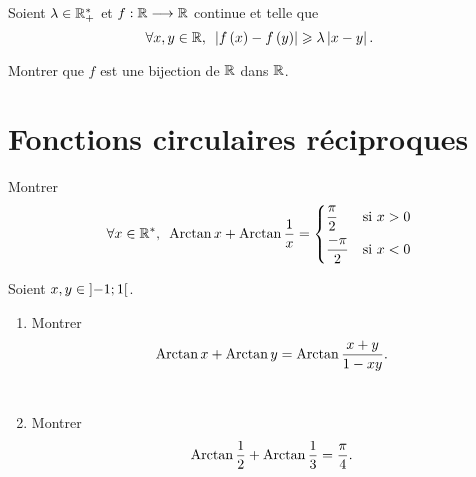 \begin{corr}
\end{corr}

\begin{exo}
Soient \(\lambda\in\mathbb{R}_+^*\) et \(f:\mathbb{R}\longrightarrow\mathbb{R}\) continue et telle que \[\quantifs{\forall x,y\in\R}\abs{f\paren{x}-f\paren{y}}\geq\lambda\abs{x-y}.\]

Montrer que \(f\) est une bijection de \(\mathbb{R}\) dans \(\mathbb{R}\).
\end{exo}

\begin{corr}
\end{corr}

\section{Fonctions circulaires réciproques}

\begin{exo}
Montrer \[\quantifs{\forall x\in\Rs}\Arctan x+\Arctan\dfrac{1}{x}=\begin{dcases}\dfrac{\pi}{2} &\text{si }x>0 \\ \dfrac{-\pi}{2} &\text{si }x<0\end{dcases}\]
\end{exo}

\begin{corr}
\end{corr}

\begin{exo}
Soient \(x,y\in\left]-1;1\right[\).

\begin{enumerate}
\item Montrer \[\operatorname{Arctan} x+\operatorname{Arctan} y=\operatorname{Arctan}\dfrac{x+y}{1-xy}.\] \\

\item Montrer \[\operatorname{Arctan}\dfrac{1}{2}+\operatorname{Arctan}\dfrac{1}{3}=\dfrac{\pi}{4}.\]
\end{enumerate}
\end{exo}

\begin{corr}
\end{corr}

